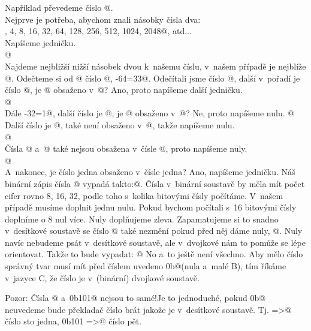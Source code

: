 \D Například převedeme číslo @. \\ 
\noindent Nejprve je potřeba, abychom znali násobky čísla dva: \\ 
, 4, 8, 16, 32, 64, 128, 256, 512, 1024, 2048@, atd... \\
Napíšeme jedničku. \\
@ \\ 
Najdeme nejbližší nižší násobek dvou k~našemu číslu, v~našem případě je nejblíže @.  Odečteme si od @ číslo @, -64=33@. Odečítali jsme číslo @, další v~pořadí je číslo @, je @ obsaženo v~@? Ano, proto napíšeme další jedničku. \\ 
@ \\ 
Dále -32=1@, další číslo je @, je @ obsaženo v~@? Ne, proto napíšeme nulu.
@ \\ 
Další číslo je @, také není obsaženo v~@, takže napíšeme nulu. \\ 
@ \\ 
Čísla @ a~@ také nejsou obsažena v~čísle @, proto napíšeme nuly. \\
@ \\
A~nakonec, je číslo jedna obsaženo v~čísle jedna? Ano, napíšeme jedničku.
Náš binární zápis čísla @ vypadá takto:@. 
Čísla v~binární soustavě by měla mít počet cifer rovno 8, 16, 32, podle toho s~kolika bitovými čísly počítáme. V~našem případě musíme doplnit jednu nulu. Pokud bychom počítali s~16 bitovými čísly doplníme o 8 nul více. Nuly doplňujeme zleva. Zapamatujeme si to snadno v~desítkové soustavě se číslo @ také nezmění pokud před něj dáme nuly, @. Nuly navíc nebudeme psát v~desítkové soustavě, ale v~dvojkové nám to pomůže se lépe orientovat. Takže to bude vypadat:
@ 
No a~to ještě není všechno. Aby mělo číslo správný tvar musí mít před číslem uvedeno \verb@0b@(nula a~malé B), tím říkáme v~jazyce C, že číslo je v~(binární) dvojkové soustavě. 

Pozor: Čísla @ a~\verb@0b101@ nejsou to samé!Je to jednoduché, pokud \verb@0b@ neuvedeme bude překladač číslo brát jakože je v~desítkové soustavě. Tj.  =>@ číslo sto jedna, \verb@0b101 =>@ číslo pět.


